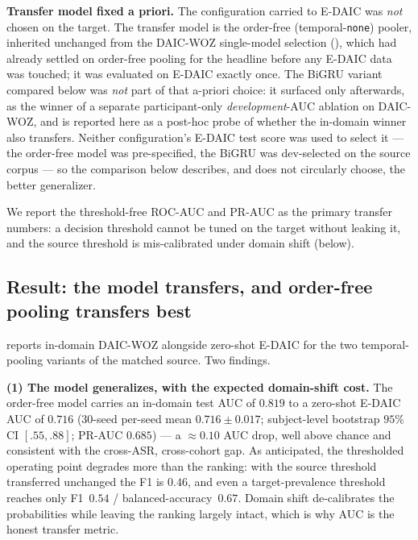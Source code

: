 \textbf{Transfer model fixed a priori.} The configuration carried to E-DAIC was
\emph{not} chosen on the target. The transfer model is the order-free
(temporal-\texttt{none}) pooler, inherited unchanged from the DAIC-WOZ
single-model selection (), which had already settled on
order-free pooling for the headline before any E-DAIC data was touched; it was
evaluated on E-DAIC exactly once. The BiGRU variant compared below was
\emph{not} part of that a-priori choice: it surfaced only afterwards, as the
winner of a separate participant-only \emph{development}-AUC ablation on
DAIC-WOZ, and is reported here as a post-hoc probe of whether the in-domain
winner also transfers. Neither configuration's E-DAIC test score was used to
select it --- the order-free model was pre-specified, the BiGRU was dev-selected
on the source corpus --- so the comparison below describes, and does not
circularly choose, the better generalizer.

We report the threshold-free ROC-AUC and PR-AUC as the primary transfer numbers:
a decision threshold cannot be tuned on the target without leaking it, and the
source threshold is mis-calibrated under domain shift (below).

\subsection{Result: the model transfers, and order-free pooling transfers best}
\label{sec:edaic-result}

 reports in-domain DAIC-WOZ alongside zero-shot E-DAIC for the two
temporal-pooling variants of the matched source. Two findings.

\textbf{(1) The model generalizes, with the expected domain-shift cost.} The
order-free model carries an in-domain test AUC of $0.819$ to a zero-shot E-DAIC
AUC of $0.716$ (30-seed per-seed mean $0.716\pm0.017$; subject-level bootstrap
$95\%$ CI $[.55,.88]$; PR-AUC $0.685$) --- a $\approx\!0.10$ AUC drop, well above
chance and consistent with the cross-ASR, cross-cohort gap. As anticipated, the thresholded operating point degrades more
than the ranking: with the source threshold transferred unchanged the F1 is
$0.46$, and even a target-prevalence threshold reaches only F1~$0.54$ /
balanced-accuracy~$0.67$. Domain shift de-calibrates the probabilities while
leaving the ranking largely intact, which is why AUC is the honest transfer
metric.

